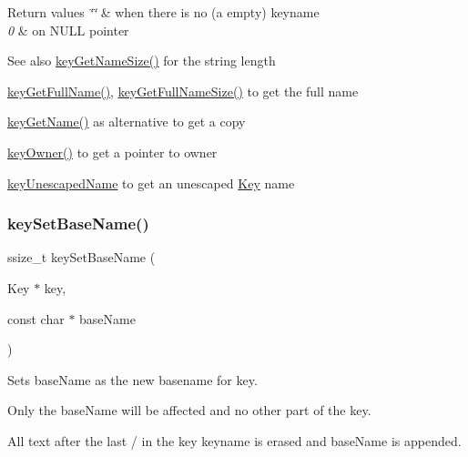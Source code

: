 \begin{DoxyItemize}
\begin{DoxyRetVals}{Return values}
{\em \char`\"{}\char`\"{}} & when there is no (a empty) keyname \\
\hline
{\em 0} & on N\+U\+LL pointer \\
\hline
\end{DoxyRetVals}
\begin{DoxySeeAlso}{See also}
\hyperlink{group__keyname_gabdbcfa51ed8a387e47ead207affa2d2e}{key\+Get\+Name\+Size()} for the string length 

\hyperlink{group__keyname_gaaba1494a5ffc976e0e56c43f4334a23c}{key\+Get\+Full\+Name()}, \hyperlink{group__keyname_gab65dc9d43d3ee08d5e936a20ebbddd23}{key\+Get\+Full\+Name\+Size()} to get the full name 

\hyperlink{group__keyname_gab29a850168d9b31c9529e90cf9ab68be}{key\+Get\+Name()} as alternative to get a copy 

\hyperlink{owner_8c_af6485fb8599714b6bbd830cf915ffea5}{key\+Owner()} to get a pointer to owner 

\hyperlink{group__keyname_ga6fe6af4c27b35d911a533f4ae4d698bb}{key\+Unescaped\+Name} to get an unescaped \hyperlink{group__key}{Key} name 
\end{DoxySeeAlso}

\end{DoxyItemize}\mbox{\label{group__keyname_ga6e804bd453f98c28b0ff51430d1df407}} 
\subsubsection{\texorpdfstring{key\+Set\+Base\+Name()}{keySetBaseName()}}
{\footnotesize\ttfamily ssize\+\_\+t key\+Set\+Base\+Name (\begin{DoxyParamCaption}\item[{Key $\ast$}]{key,  }\item[{const char $\ast$}]{base\+Name }\end{DoxyParamCaption})}



Sets {\ttfamily base\+Name} as the new basename for {\ttfamily key}. 

Only the base\+Name will be affected and no other part of the key.

All text after the last {\ttfamily \textquotesingle{}/\textquotesingle{}} in the {\ttfamily key} keyname is erased and {\ttfamily base\+Name} is appended.

